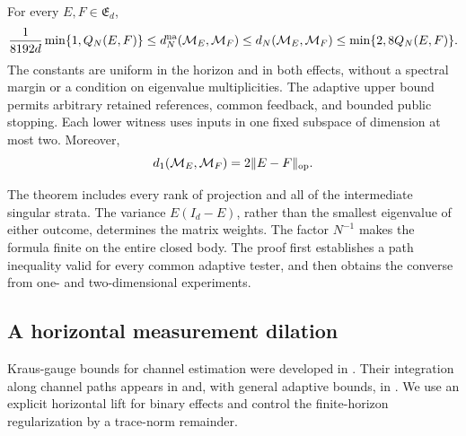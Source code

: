 \begin{theorem}
\label{thm:matrixmetric76}
For every $E,F\in\mathfrak E_d$,
\begin{equation}\label{eq:matrixmetric76}
 \frac1{8192d}\min\{1,Q_N(E,F)\}
 \le d_N^{\rm na}(\mathcal M_E,\mathcal M_F)
 \le d_N(\mathcal M_E,\mathcal M_F)
 \le\min\{2,8Q_N(E,F)\}.
\end{equation}
The constants are uniform in the horizon and in both effects,
without a spectral margin or a condition on eigenvalue multiplicities.
The adaptive upper bound permits arbitrary retained references,
common feedback, and bounded public stopping.  Each lower witness
uses inputs in one fixed subspace of dimension at most two.  Moreover,
\begin{equation}\label{eq:matrixoneuse76}
 d_1(\mathcal M_E,\mathcal M_F)=2\|E-F\|_{\rm op}.
\end{equation}
\end{theorem}

The theorem includes every rank of projection and all of the
intermediate singular strata.  The variance $E(I_d-E)$, rather than
the smallest eigenvalue of either outcome, determines the matrix
weights.  The factor $N^{-1}$ makes the formula finite on the entire
closed body.  The proof first establishes a path inequality valid for
every common adaptive tester, and then obtains the converse from
one- and two-dimensional experiments.

\subsection{A horizontal measurement dilation}

Kraus-gauge bounds for channel estimation were developed in
\cite{FI76,DKG67,DM76}.  Their integration along channel paths
appears in \cite[Section~III, equation~(26)]{YF76} and, with
general adaptive bounds, in \cite[Section~IV.A]{SD76}.  We use an
explicit horizontal lift for binary effects and control the
finite-horizon regularization by a trace-norm remainder.

